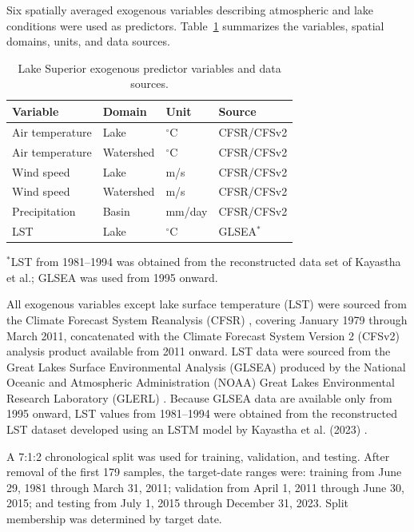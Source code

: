 \documentclass[conference]{IEEEtran}
\begin{document}
Six spatially averaged exogenous variables describing atmospheric and lake conditions were used as predictors. Table~\ref{tab:dataset_variables} summarizes the variables, spatial domains, units, and data sources.

\begin{table}[t]
    \centering
    \caption{Lake Superior exogenous predictor variables and data sources.}
    \label{tab:dataset_variables}
    \small
    \begin{tabular}{llll}
    \hline
    \textbf{Variable} & \textbf{Domain} & \textbf{Unit} & \textbf{Source} \\
    \hline
    Air temperature & Lake      & $^\circ$C & CFSR/CFSv2 \\
    Air temperature & Watershed & $^\circ$C & CFSR/CFSv2 \\
    Wind speed      & Lake      & m/s       & CFSR/CFSv2 \\
    Wind speed      & Watershed & m/s       & CFSR/CFSv2 \\
    Precipitation   & Basin     & mm/day    & CFSR/CFSv2 \\
    LST             & Lake      & $^\circ$C & GLSEA$^{*}$ \\
    \hline
    \end{tabular}
    \par\vspace{1mm}
    \parbox{\columnwidth}{
        \footnotesize
        $^{*}$LST from 1981--1994 was obtained from the reconstructed data set of Kayastha et al.; GLSEA was used from 1995 onward.
    }
\end{table}

All exogenous variables except lake surface temperature (LST) were sourced from the Climate Forecast System Reanalysis (CFSR) \cite{saha2010cfsr}, covering January 1979 through March 2011, concatenated with the Climate Forecast System Version 2 (CFSv2) analysis product \cite{saha2014cfsv2} available from 2011 onward. LST data were sourced from the Great Lakes Surface Environmental Analysis (GLSEA) produced by the National Oceanic and Atmospheric Administration (NOAA) Great Lakes Environmental Research Laboratory (GLERL) \cite{noaa2026glsea}. Because GLSEA data are available only from 1995 onward, LST values from 1981--1994 were obtained from the reconstructed LST dataset developed using an LSTM model by Kayastha et al. (2023) \cite{kayastha2023lst}.

A 7:1:2 chronological split was used for training, validation, and testing. After removal of the first 179 samples, the target-date ranges were: training from June 29, 1981 through March 31, 2011; validation from April 1, 2011 through June 30, 2015; and testing from July 1, 2015 through December 31, 2023. Split membership was determined by target date.
\end{document}
